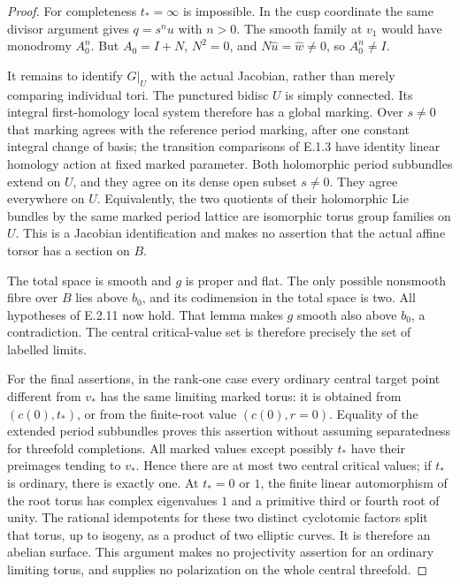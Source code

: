 \begin{proof}
For completeness $t_*=\infty$ is impossible.  In the
cusp coordinate the same divisor argument gives
$q=s^n u$ with $n>0$.  The smooth family at $v_1$
would have monodromy $A_0^n$.  But
$A_0=I+N$, $N^2=0$, and
$N\widehat u=\widehat w\ne0$, so $A_0^n\ne I$.

It remains to identify $G|_U$ with the actual Jacobian,
rather than merely comparing individual tori.
The punctured bidisc $U$ is simply connected.  Its
integral first-homology local system therefore has
a global marking.  Over $s\ne0$ that marking agrees
with the reference period marking, after one constant
integral change of basis; the transition comparisons
of E.1.3 have identity linear homology action at
fixed marked parameter.  Both holomorphic period
subbundles extend on $U$, and they agree on its dense
open subset $s\ne0$.  They agree everywhere on $U$.
Equivalently, the two quotients of their holomorphic
Lie bundles by the same marked period lattice are
isomorphic torus group families on $U$.  This is a
Jacobian identification and makes no assertion that
the actual affine torsor has a section on $B$.

The total space is smooth and $g$ is proper and flat.
The only possible nonsmooth fibre over $B$ lies above
$b_0$, and its codimension in the total space is two.
All hypotheses of E.2.11 now hold.  That lemma makes
$g$ smooth also above $b_0$, a contradiction.  The
central critical-value set is therefore precisely
the set of labelled limits.

For the final assertions, in the rank-one case every
ordinary central target point different from $v_*$
has the same limiting marked torus: it is obtained
from $(c(0),t_*)$, or from the finite-root value
$(c(0),r=0)$.  Equality of the extended period
subbundles proves this assertion without assuming
separatedness for threefold completions.
All marked values except possibly $t_*$ have their
preimages tending to $v_*$.  Hence there are at most
two central critical values; if $t_*$ is ordinary,
there is exactly one.
At $t_*=0$ or $1$, the finite linear automorphism of
the root torus has complex eigenvalues $1$ and a
primitive third or fourth root of unity.  The
rational idempotents for these two distinct
cyclotomic factors split that torus, up to isogeny,
as a product of two elliptic curves.  It is therefore
an abelian surface.  This argument makes no
projectivity assertion for an ordinary limiting
torus, and supplies no polarization on the whole
central threefold.
\end{proof}

